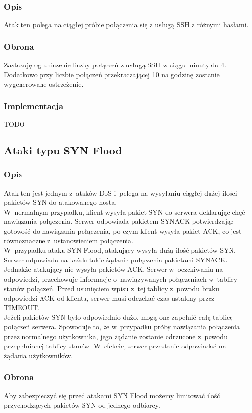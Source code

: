 \documentclass[a4paper,10pt]{article}
\begin{document}
		\subsubsection{Opis}
			Atak ten polega na ciągłej próbie połączenia się z usługą SSH z różnymi hasłami.
		\subsubsection{Obrona}
			Zastosuję ograniczenie liczby połączeń z usługą SSH w ciągu minuty do 4.\\
			Dodatkowo przy liczbie połączeń przekraczającej 10 na godzinę zostanie wygenerowane ostrzeżenie.
		\subsubsection{Implementacja}
			TODO
	\subsection{Ataki typu SYN Flood}
		\subsubsection{Opis}
			Atak ten jest jednym z~ataków DoS i~polega na wysyłaniu ciągłej dużej ilości pakietów SYN do atakowanego hosta.\\
			W~normalnym przypadku, klient wysyła pakiet SYN do serwera deklarując chęć nawiązania połączenia. Serwer odpowiada pakietem SYN\dywiz ACK potwierdzając gotowość do nawiązania połączenia, po czym klient wysyła pakiet ACK, co jest równoznaczne z~ustanowieniem połączenia.\\
			W~przypadku ataku SYN Flood, atakujący wysyła dużą ilość pakietów SYN. Serwer odpowiada na każde takie żądanie połączenia pakietami SYN\dywiz ACK. Jednakże atakujący nie wysyła pakietów ACK. Serwer w~oczekiwaniu na odpowiedzi, przechowuje informacje o~nawiązywanych połączeniach w~tablicy stanów połączeń. Przed usunięciem wpisu z~tej tablicy z~powodu braku odpowiedzi ACK od klienta, serwer musi odczekać czas ustalony przez TIMEOUT.\\
			Jeżeli pakietów SYN było odpowiednio dużo, mogą one zapełnić całą tablicę połączeń serwera. Spowoduje to, że w~przypadku próby nawiązania połączenia przez normalnego użytkownika, jego żądanie zostanie odrzucone z~powodu przepełnionej tablicy stanów. W~efekcie, serwer przestanie odpowiadać na żądania użytkowników.
		\subsubsection{Obrona}
			Aby zabezpieczyć się przed atakami SYN Flood możemy limitować ilość przychodzących pakietów SYN od jednego odbiorcy.
\end{document}
